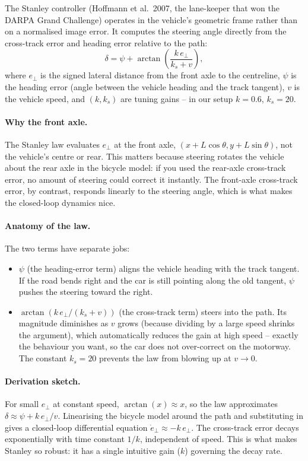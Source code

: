 The Stanley controller (Hoffmann et al.\ 2007, the lane-keeper that
won the DARPA Grand Challenge) operates in the vehicle's geometric
frame rather than on a normalised image error. It computes the
steering angle directly from the cross-track error and heading error
relative to the path:
\[
\delta = \psi + \arctan\!\left(\frac{k\,e_\perp}{k_s + v}\right),
\]
where $e_\perp$ is the signed lateral distance from the front axle to
the centreline, $\psi$ is the heading error (angle between the vehicle
heading and the track tangent), $v$ is the vehicle speed, and
$(k, k_s)$ are tuning gains -- in our setup $k=0.6$, $k_s=20$.

\paragraph{Why the front axle.}
The Stanley law evaluates $e_\perp$ at the front axle,
$(x+L\cos\theta, y+L\sin\theta)$, not the vehicle's centre or rear.
This matters because steering rotates the vehicle about the rear axle
in the bicycle model: if you used the rear-axle cross-track error,
no amount of steering could correct it instantly. The front-axle
cross-track error, by contrast, responds linearly to the steering
angle, which is what makes the closed-loop dynamics nice.

\paragraph{Anatomy of the law.}
The two terms have separate jobs:
\begin{itemize}[leftmargin=1.4em,itemsep=2pt]
  \item $\psi$ (the heading-error term) aligns the vehicle heading
        with the track tangent. If the road bends right and the car
        is still pointing along the old tangent, $\psi$ pushes the
        steering toward the right.
  \item $\arctan(k\,e_\perp/(k_s+v))$ (the cross-track term) steers
        into the path. Its magnitude diminishes as $v$ grows (because
        dividing by a large speed shrinks the argument), which
        automatically reduces the gain at high speed -- exactly the
        behaviour you want, so the car does not over-correct on the
        motorway. The constant $k_s=20$ prevents the law from blowing
        up at $v\to 0$.
\end{itemize}

\paragraph{Derivation sketch.}
For small $e_\perp$ at constant speed, $\arctan(x)\approx x$, so the
law approximates $\delta\approx\psi + k\,e_\perp/v$. Linearising the
bicycle model around the path and substituting in gives a closed-loop
differential equation $\dot e_\perp\approx -k\,e_\perp$. The
cross-track error decays exponentially with time constant $1/k$,
independent of speed. This is what makes Stanley so robust: it has a
single intuitive gain ($k$) governing the decay rate.

